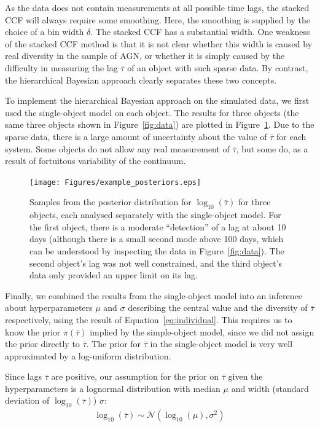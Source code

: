 \documentclass[useAMS,usenatbib]{mn2e}
\begin{document}
As the data does not contain measurements at all possible time lags, the stacked
CCF will always require some smoothing. Here, the smoothing is supplied by the
choice of a bin width $\delta$. The stacked CCF has a substantial width. One
weakness of the stacked CCF method is that it is not clear whether this width
is caused by real diversity in the sample of AGN, or whether it is simply caused
by the difficulty in measuring the lag $\bar{\tau}$ of an object with such
sparse data. By contrast, the hierarchical Bayesian approach clearly separates
these two concepts.

To implement the hierarchical Bayesian approach on the simulated data, we first
used the single-object model on each object. The results for three objects
(the same three objects shown in Figure~\ref{fig:data}) are plotted in
Figure~\ref{fig:example_posteriors}. Due to the sparse data, there is a large
amount of uncertainty about the value of $\bar{\tau}$ for each system. Some
objects do not allow any real measurement of $\bar{\tau}$, but some do, as a
result of fortuitous variability of the continuum.

\begin{figure}
\begin{center}
\texttt{[image: Figures/example\_posteriors.eps]}
\caption{Samples from the posterior distribution for $\log_{10}(\bar{\tau})$
for three objects, each analysed separately with the single-object model. For
the first object, there is a moderate ``detection'' of a lag at about 10 days
(although there is a small second mode above 100 days, which can be understood
by inspecting the data in Figure~\ref{fig:data}).
The second object's lag was not well constrained,
and the third object's data only provided an upper limit on its lag.
\label{fig:example_posteriors}}
\end{center}
\end{figure}

Finally, we combined the results from the single-object model into an inference
about hyperparameters $\mu$ and $\sigma$ describing the central value and
the diversity of $\bar{\tau}$ respectively, using the result of
Equation~\ref{eq:individual}. This requires us to know the prior $\pi(\bar{\tau})$
implied by the simple-object model, since we did not assign the prior directly
to $\bar{\tau}$. The prior for $\bar{\tau}$ in the single-object model is
very well approximated by a log-uniform distribution.

Since lags $\bar{\tau}$ are positive, 
our assumption for the prior on $\bar{\tau}$ given
the hyperparameters is a lognormal distribution with median $\mu$ and
width (standard deviation of $\log_{10}(\bar{\tau})$) $\sigma$:
\begin{eqnarray}
\log_{10}(\bar{\tau}) \sim \mathcal{N}(\log_{10}(\mu), \sigma^2)
\end{eqnarray}
\end{document}
